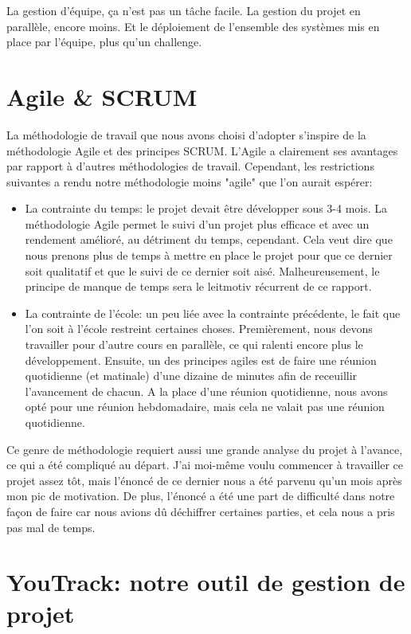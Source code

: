 La gestion d'équipe, ça n'est pas un tâche facile. La gestion du projet en parallèle, encore moins. Et le déploiement de l'ensemble des systèmes mis en place par l'équipe, plus qu'un challenge.

\section{Agile \& SCRUM}

La méthodologie de travail que nous avons choisi d'adopter s'inspire de la méthodologie Agile et des principes SCRUM. L'Agile a clairement ses avantages par rapport à d'autres méthodologies de travail. Cependant, les restrictions suivantes a rendu notre méthodologie moins "agile" que l'on aurait espérer:

\begin{itemize}
    \item La contrainte du temps: le projet devait être développer sous 3-4 mois. La méthodologie Agile permet le suivi d'un projet plus efficace et avec un rendement amélioré, au détriment du temps, cependant. Cela veut dire que nous prenons plus de temps à mettre en place le projet pour que ce dernier soit qualitatif et que le suivi de ce dernier soit aisé. Malheureusement, le principe de manque de temps sera le leitmotiv récurrent de ce rapport.
    \item La contrainte de l'école: un peu liée avec la contrainte précédente, le fait que l'on soit à l'école restreint certaines choses. Premièrement, nous devons travailler pour d'autre cours en parallèle, ce qui ralenti encore plus le développement. Ensuite, un des principes agiles est de faire une réunion quotidienne (et matinale) d'une dizaine de minutes afin de receuillir l'avancement de chacun. A la place d'une réunion quotidienne, nous avons opté pour une réunion hebdomadaire, mais cela ne valait pas une réunion quotidienne.
\end{itemize}

Ce genre de méthodologie requiert aussi une grande analyse du projet à l'avance, ce qui a été compliqué au départ. J'ai moi-même voulu commencer à travailler ce projet assez tôt, mais l'énoncé de ce dernier nous a été parvenu qu'un mois après mon pic de motivation. De plus, l'énoncé a été une part de difficulté dans notre façon de faire car nous avions dû déchiffrer certaines parties, et cela nous a pris pas mal de temps.

\section{YouTrack: notre outil de gestion de projet}

